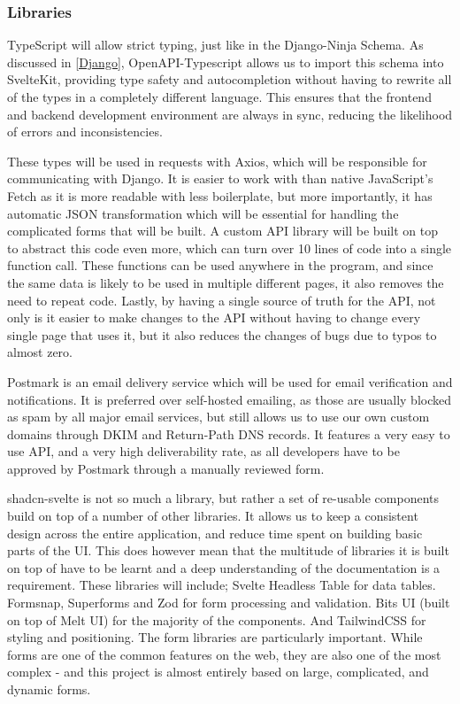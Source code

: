\subsubsection{Libraries}
TypeScript will allow strict typing, just like in the Django-Ninja Schema. As discussed in \ref{Django}, OpenAPI-Typescript allows us to import this schema into SvelteKit, providing type safety and autocompletion without having to rewrite all of the types in a completely different language. This ensures that the frontend and backend development environment are always in sync, reducing the likelihood of errors and inconsistencies. 

These types will be used in requests with Axios, which will be responsible for communicating with Django. It is easier to work with than native JavaScript's Fetch as it is more readable with less boilerplate, but more importantly, it has automatic JSON transformation which will be essential for handling the complicated forms that will be built. A custom API library will be built on top to abstract this code even more, which can turn over 10 lines of code into a single function call. These functions can be used anywhere in the program, and since the same data is likely to be used in multiple different pages, it also removes the need to repeat code. Lastly, by having a single source of truth for the API, not only is it easier to make changes to the API without having to change every single page that uses it, but it also reduces the changes of bugs due to typos to almost zero.

Postmark is an email delivery service which will be used for email verification and notifications. It is preferred over self-hosted emailing, as those are usually blocked as spam by all major email services, but still allows us to use our own custom domains through DKIM and Return-Path DNS records. It features a very easy to use API, and a very high deliverability rate, as all developers have to be approved by Postmark through a manually reviewed form.

shadcn-svelte is not so much a library, but rather a set of re-usable components build on top of a number of other libraries. It allows us to keep a consistent design across the entire application, and reduce time spent on building basic parts of the UI. This does however mean that the multitude of libraries it is built on top of have to be learnt and a deep understanding of the documentation is a requirement. These libraries will include; Svelte Headless Table for data tables. Formsnap, Superforms and Zod for form processing and validation. Bits UI (built on top of Melt UI) for the majority of the components. And TailwindCSS for styling and positioning. The form libraries are particularly important. While forms are one of the common features on the web, they are also one of the most complex - and this project is almost entirely based on large, complicated, and dynamic forms.

